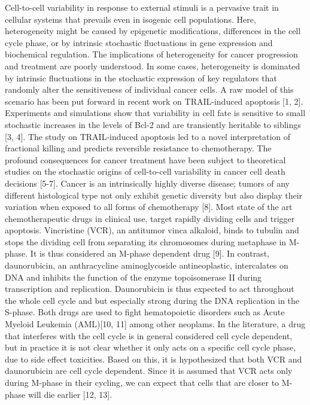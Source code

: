 \documentclass[pdftex,12pt,a4paper]{report}
\begin{document}

Cell-to-cell variability in response to external stimuli is a pervasive trait in cellular systems that prevails even in isogenic cell populations. Here, heterogeneity might be caused by epigenetic modifications, differences in the cell cycle phase, or by intrinsic stochastic fluctuations in gene expression and biochemical regulation. The implications of heterogeneity for cancer progression and treatment are poorly understood. In some cases, heterogeneity is dominated by intrinsic fluctuations in the stochastic expression of key regulators that randomly alter the sensitiveness of individual cancer cells. A raw model of this scenario has been put forward in recent work on TRAIL-induced apoptosis [1, 2]. Experiments and simulations show that variability in cell fate is sensitive to small stochastic increases in the levels of Bcl-2 and are transiently heritable to siblings [3, 4]. The study on TRAIL-induced apoptosis led to a novel interpretation of fractional killing and predicts reversible resistance to chemotherapy. The profound consequences for cancer treatment have been subject to theoretical studies on the stochastic origins of cell-to-cell variability in cancer cell death decisions [5-7]. 
Cancer is an intrinsically highly diverse disease; tumors of any different histological type not only exhibit genetic diversity but also display their variation when exposed to all forms of chemotherapy [8]. Most state of the art chemotherapeutic drugs in clinical use, target rapidly dividing cells and trigger apoptosis. Vincristine (VCR), an antitumor vinca alkaloid, binds to tubulin and stops the dividing cell from separating its chromosomes during metaphase in M-phase. It is thus considered an M-phase dependent drug [9]. In contrast, daunorubicin, an anthracycline aminoglycoside antineoplastic, intercalates on DNA and inhibits the function of the enzyme topoisomerase II during transcription and replication. Daunorubicin is thus expected to act throughout the whole cell cycle and but especially strong during the DNA replication in the S-phase. Both drugs are used to fight hematopoietic disorders such as Acute Myeloid Leukemia (AML)[10, 11] among other neoplams. In the literature, a drug that interferes with the cell cycle is in general considered cell cycle dependent, but in practice it is not clear whether it only acts on a specific cell cycle phase, due to side effect toxicities. Based on this, it is hypothesized that both VCR and daunorubicin are cell cycle dependent. Since it is assumed that VCR acts only during M-phase in their cycling, we can expect that cells that are closer to M-phase will die earlier [12, 13].  
\end{document}
